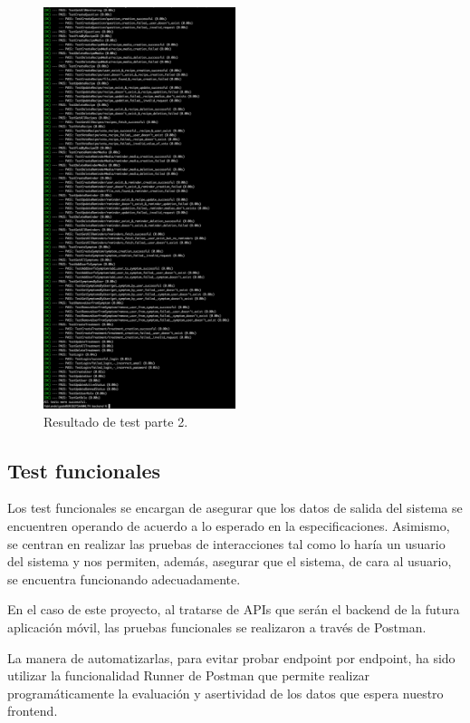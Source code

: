 \begin{figure}[h]
    \centering
    \includegraphics[width=0.5\textwidth]{img/manual/test_parte_2.png}
    \caption{Resultado de test parte 2.} \label{Img:Resultado+de+test+parte+2}
\end{figure} 

\subsection{Test funcionales}

Los test funcionales se encargan de asegurar que los datos de salida del sistema se encuentren operando de acuerdo a lo esperado en la especificaciones.
Asimismo, se centran en realizar las pruebas de interacciones tal como lo haría un usuario del sistema y nos permiten, además, asegurar que el sistema, de cara al usuario, se encuentra funcionando adecuadamente.

En el caso de este proyecto, al tratarse de APIs que serán el backend de la futura aplicación móvil, las pruebas funcionales se realizaron a través de Postman.

La manera de automatizarlas, para evitar probar endpoint por endpoint, ha sido utilizar la funcionalidad Runner de Postman que permite realizar programáticamente la evaluación y asertividad de los datos que espera nuestro frontend.

